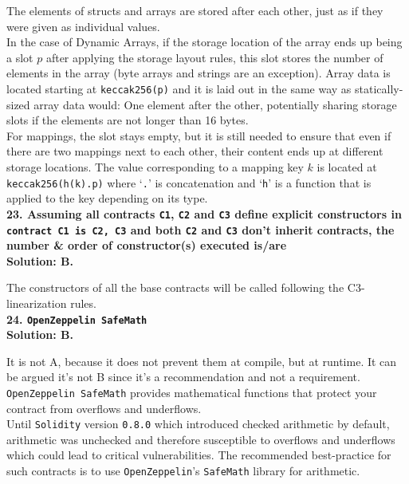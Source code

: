 The elements of structs and arrays are stored after each other, just as if they were given as individual values.\\
In the case of Dynamic Arrays, if the storage location of the array ends up being a slot $p$ after applying the storage layout rules, this slot stores the number of elements in the array (byte arrays and strings are an exception).
Array data is located starting at \verb|keccak256(p)| and it is laid out in the same way as statically-sized array data would: One element after the other, potentially sharing storage slots if the elements are not longer than 16 bytes.\\

For mappings, the slot stays empty, but it is still needed to ensure that even if there are two mappings next to each other, their content ends up at different storage locations.
The value corresponding to a mapping key $k$ is located at \verb|keccak256(h(k).p)| where `\verb|.|' is concatenation and `\verb|h|' is a function that is applied to the key depending on its type.\\

\textbf{23. Assuming all contracts \texttt{C1}, \texttt{C2} and \texttt{C3} define explicit constructors in \texttt{contract C1 is C2, C3}  and both \texttt{C2} and \texttt{C3} don't inherit contracts, the number \& order of constructor(s) executed is/are}\label{sec:exam3_q23}\\

\textbf{Solution: B.}

The constructors of all the base contracts will be called following the C3-linearization rules.\\

\textbf{24. \texttt{OpenZeppelin SafeMath}}\label{sec:exam3_q24}\\

\textbf{Solution: B.}

It is not A, because it does not prevent them at compile, but at runtime.
It can be argued it's not B since it's a recommendation and not a requirement.\\

\verb|OpenZeppelin SafeMath| provides mathematical functions that protect your contract from overflows and underflows.\\

Until \verb|Solidity| version \verb|0.8.0| which introduced checked arithmetic by default, arithmetic was unchecked and therefore susceptible to overflows and underflows which could lead to critical vulnerabilities.
The recommended best-practice for such contracts is to use \verb|OpenZeppelin|'s \verb|SafeMath| library for arithmetic.\\

